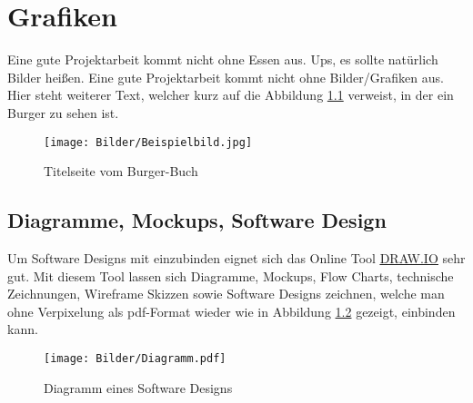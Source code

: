 \chapter{Grafiken}
Eine gute Projektarbeit kommt nicht ohne Essen aus. Ups, es sollte natürlich Bilder heißen. Eine gute Projektarbeit kommt nicht ohne Bilder/Grafiken aus. Hier steht weiterer Text, welcher kurz auf die Abbildung \ref{fig:Referenz-auf-Bild} verweist, in der ein Burger zu sehen ist.

\begin{figure}[ht]
	\centering
	\texttt{[image: Bilder/Beispielbild.jpg]} 
	\caption{Titelseite vom Burger-Buch \cite{Rau.2014}}
	\label{fig:Referenz-auf-Bild}
\end{figure}

\section{Diagramme, Mockups, Software Design}

Um Software Designs mit einzubinden eignet sich das Online Tool \underline{\href{https://www.draw.io/}{DRAW.IO}} sehr gut. Mit diesem Tool lassen sich Diagramme, Mockups, Flow Charts, technische Zeichnungen, Wireframe Skizzen sowie Software Designs zeichnen, welche man ohne Verpixelung als pdf-Format wieder wie in Abbildung \ref{fig:Diagramm-DrawIo} gezeigt, einbinden kann.

\begin{figure}[ht]
	\centering
	\texttt{[image: Bilder/Diagramm.pdf]} 
	\caption{Diagramm eines Software Designs}
	\label{fig:Diagramm-DrawIo}
\end{figure}
